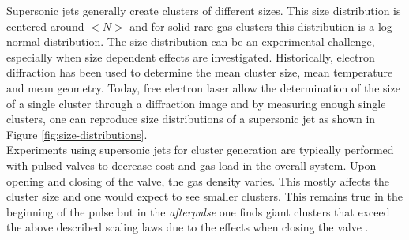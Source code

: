 Supersonic jets generally create clusters of different sizes. This size distribution is centered around $<N>$ and for solid rare gas clusters this distribution is a log-normal distribution. The size distribution can be an experimental challenge, especially when size dependent effects are investigated. Historically, electron diffraction \cite{Farges-1981-SurfSci,Bartell-1986-ChemRev} has been used to determine the mean cluster size, mean temperature and mean geometry. Today, free electron laser allow the determination of the size of a single cluster through a diffraction image and by measuring enough single clusters, one can reproduce size distributions of a supersonic jet as shown in Figure \ref{fig:size-distributions}.\\
Experiments using supersonic jets for cluster generation are typically performed with pulsed valves to decrease cost and gas load in the overall system. Upon opening and closing of the valve, the gas density varies. This mostly affects the cluster size and one would expect to see smaller clusters. This remains true in the beginning of the pulse but in the \textit{afterpulse} one finds giant clusters that exceed the above described scaling laws due to the effects when closing the valve \cite{Rupp-2014-JCP}.
%
%
%
%
%
